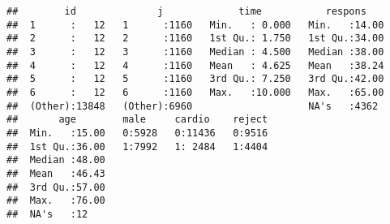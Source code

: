 \documentclass[
]{article}
\newenvironment{Shaded}{\begin{snugshade}}{\end{snugshade}}
\newcommand{\AttributeTok}[1]{\textcolor[rgb]{0.77,0.63,0.00}{#1}}
\newcommand{\FunctionTok}[1]{\textcolor[rgb]{0.00,0.00,0.00}{#1}}
\newcommand{\NormalTok}[1]{#1}
\newcommand{\OtherTok}[1]{\textcolor[rgb]{0.56,0.35,0.01}{#1}}
\newcommand{\SpecialCharTok}[1]{\textcolor[rgb]{0.00,0.00,0.00}{#1}}
\begin{document}
\begin{Shaded}
\end{Shaded}

\begin{verbatim}
##        id              j             time           respons     
##  1      :   12   1      :1160   Min.   : 0.000   Min.   :14.00  
##  2      :   12   2      :1160   1st Qu.: 1.750   1st Qu.:34.00  
##  3      :   12   3      :1160   Median : 4.500   Median :38.00  
##  4      :   12   4      :1160   Mean   : 4.625   Mean   :38.24  
##  5      :   12   5      :1160   3rd Qu.: 7.250   3rd Qu.:42.00  
##  6      :   12   6      :1160   Max.   :10.000   Max.   :65.00  
##  (Other):13848   (Other):6960                    NA's   :4362   
##       age        male     cardio    reject  
##  Min.   :15.00   0:5928   0:11436   0:9516  
##  1st Qu.:36.00   1:7992   1: 2484   1:4404  
##  Median :48.00                              
##  Mean   :46.43                              
##  3rd Qu.:57.00                              
##  Max.   :76.00                              
##  NA's   :12
\end{verbatim}
\end{document}
